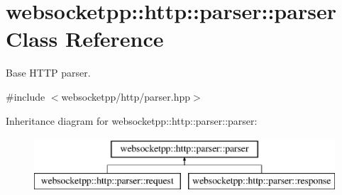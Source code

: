 \hypertarget{classwebsocketpp_1_1http_1_1parser_1_1parser}{}\section{websocketpp\+:\+:http\+:\+:parser\+:\+:parser Class Reference}
\label{classwebsocketpp_1_1http_1_1parser_1_1parser}


Base H\+T\+T\+P parser.  




{\ttfamily \#include $<$websocketpp/http/parser.\+hpp$>$}

Inheritance diagram for websocketpp\+:\+:http\+:\+:parser\+:\+:parser\+:\begin{figure}[H]
\begin{center}
\leavevmode
\includegraphics[height=2.000000cm]{classwebsocketpp_1_1http_1_1parser_1_1parser}
\end{center}
\end{figure}
